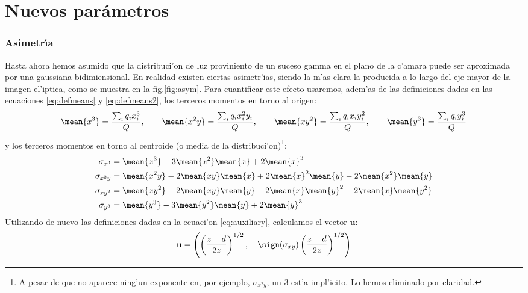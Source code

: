 \section{Nuevos par\'ametros}

\subsubsection{Asimetr\'\i a}
%
Hasta ahora hemos asumido que la distribuci'on de luz proviniento de
un suceso gamma en el plano de la c'amara puede ser aproximada por una
gaussiana bidimiensional. En realidad existen ciertas asimetr'ias,
siendo la m'as clara la producida a lo largo del eje mayor de la
imagen el'iptica, como se muestra en la fig.\ref{fig:asym}. Para
cuantificar este efecto usaremos, adem'as de las definiciones dadas en
las ecuaciones \eqref{eq:defmeans} y \eqref{eq:defmeans2}, los
terceros momentos en torno al origen:
%
\begin{equation}
  \label{eq:defthirdmom}
  \mean{x^3} = \frac{\sum_i q_i x_i^3}{Q}, \qquad
  \mean{x^2y} = \frac{\sum_i q_i x_i^2 y_i}{Q}, \qquad
  \mean{xy^2} = \frac{\sum_i q_i x_i y_i^2}{Q}, \qquad
  \mean{y^3} = \frac{\sum_i q_i y_i^3}{Q}  
\end{equation}
%
y los terceros momentos en torno al centroide (o media de la
distribuci'on)\footnote{A pesar de que no aparece ning'un exponente
  en, por ejemplo, $\sigma_{x^2y}$, un $3$ est'a impl'icito. Lo hemos
  eliminado por claridad.}:
%
\begin{equation}
  \label{eq:defthirmommean}
  \begin{split}
    \sigma_{x^3} & = \mean{x^3} - 3\mean{x^2}\mean{x} + 2\mean{x}^3\\
    \sigma_{x^2 y} & = \mean{x^2 y} - 2\mean{xy}\mean{x} 
    + 2\mean{x}^2\mean{y} - 2\mean{x^2}\mean{y} \\
    \sigma_{x y^2} & = \mean{x y^2} - 2\mean{xy}\mean{y} 
    + 2\mean{x}\mean{y}^2 - 2\mean{x}\mean{y^2} \\
    \sigma_{y^3} & = \mean{y^3} - 3\mean{y^2}\mean{y} + 2\mean{y}^3
  \end{split}
\end{equation}
%
Utilizando de nuevo las definiciones dadas en la ecuaci'on
\eqref{eq:auxiliary}, calculamos el vector $\mathbf{u}$:
%
\begin{equation}
  \label{eq:vectoru}
  \mathbf{u} = \left(
    \left(\frac{z-d}{2z}\right)^{1/2},\quad
    \sign(\sigma_{xy})\left(\frac{z-d}{2z}\right)^{1/2}
    \right)
\end{equation}
